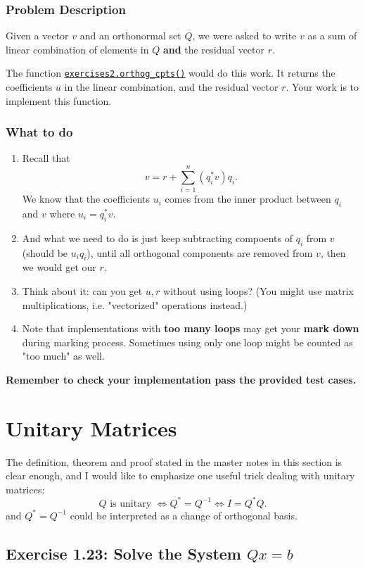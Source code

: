 \subsubsection*{Problem Description}%
Given a vector $v$ and an orthonormal set $Q$, we were asked to write $v$ as a sum of linear combination of elements in $Q$ \textbf{and} the residual vector $r$.

\medskip
\noindent The function \href{https://comp-lin-alg.github.io/cla_utils.html#cla_utils.exercises2.orthog_cpts}{\texttt{exercises2.orthog\_cpts()}} would do this work. It returns the coefficients $u$ in the linear combination, and the residual vector $r$. Your work is to implement this function.\subsubsection*{What to do}%
\begin{enumerate}
\item Recall that
  \[
    v = r + \sum_{i=1}^{n} (q^{*}_i v)q_i
  .\]
  We know that the coefficients $u_i$ comes from the inner product between $q_i$ and $v$ where $u_i = q^{*}_iv$.
\item And what we need to do is just keep subtracting compoents of $q_i$ from $v$ (should be $u_iq_i$), until all orthogonal components are removed from  $v$, then we would get our  $r$.
\item Think about it: can you get \(u, r\) without using loops? (You might use matrix multiplications, i.e. "vectorized" operations instead.)
\item Note that implementations with \textbf{too many loops} may get your \textbf{mark down} during marking process. Sometimes using only one loop might be counted as "too much" as well.
\end{enumerate} 
\textbf{Remember to check your implementation pass the provided test cases.}
\section{Unitary Matrices}%
The definition, theorem and proof stated in the master notes in this section is clear enough, and I would like to emphasize one useful trick dealing with unitary matrices:
\[
Q \text{ is unitary } \iff Q^{*} = Q^{-1} \iff I = Q^{*}Q 
.\] 
and $Q^{*} = Q^{-1}$ could be interpreted as a change of orthogonal basis.
\subsection*{Exercise 1.23: Solve the System $Qx=b$}
